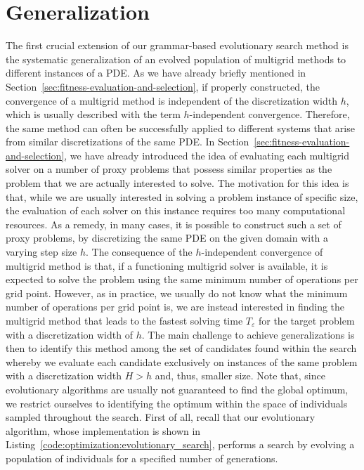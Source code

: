 \section{Generalization}
The first crucial extension of our grammar-based evolutionary search method is the systematic generalization of an evolved population of multigrid methods to different instances of a PDE. 
As we have already briefly mentioned in Section~\ref{sec:fitness-evaluation-and-selection}, if properly constructed, the convergence of a multigrid method is independent of the discretization width $h$, which is usually described with the term $h$-independent convergence.
Therefore, the same method can often be successfully applied to different systems that arise from similar discretizations of the same PDE.
In Section~\ref{sec:fitness-evaluation-and-selection}, we have already introduced the idea of evaluating each multigrid solver on a number of proxy problems that possess similar properties as the problem that we are actually interested to solve.
The motivation for this idea is that, while we are usually interested in solving a problem instance of specific size, the evaluation of each solver on this instance requires too many computational resources.
As a remedy, in many cases, it is possible to construct such a set of proxy problems, by discretizing the same PDE on the given domain with a varying step size $h$.
The consequence of the $h$-independent convergence of multigrid method is that, if a functioning multigrid solver is available, it is expected to solve the problem using the same minimum number of operations per grid point.
However, as in practice, we usually do not know what the minimum number of operations per grid point is, we are instead interested in finding the multigrid method that leads to the fastest solving time $T_\varepsilon$ for the target problem with a discretization width of $h$.
The main challenge to achieve generalizations is then to identify this method among the set of candidates found within the search whereby we evaluate each candidate exclusively on instances of the same problem with a discretization width $H > h$ and, thus, smaller size.
Note that, since evolutionary algorithms are usually not guaranteed to find the global optimum, we restrict ourselves to identifying the optimum within the space of individuals sampled throughout the search.
First of all, recall that our evolutionary algorithm, whose implementation is shown in Listing~\ref{code:optimization:evolutionary_search}, performs a search by evolving a population of individuals for a specified number of generations.
